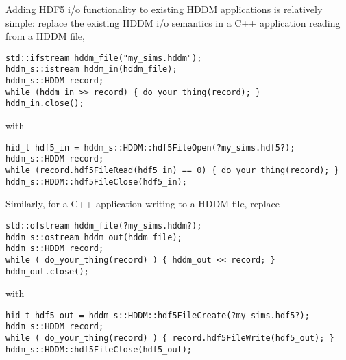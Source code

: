 \documentclass{revtex4}
\begin{document}
Adding HDF5 i/o functionality to existing HDDM applications is relatively 
simple: replace the existing HDDM i/o semantics in a C++ application reading
from a HDDM file,

\vspace{0.5cm}
\begin{minipage}{12cm}
\begin{verbatim}
std::ifstream hddm_file("my_sims.hddm");
hddm_s::istream hddm_in(hddm_file);
hddm_s::HDDM record;
while (hddm_in >> record) { do_your_thing(record); }
hddm_in.close();
\end{verbatim}
\end{minipage}
\vspace{0.5cm}

with

\vspace{0.5cm}
\begin{minipage}{12cm}
\begin{verbatim}
hid_t hdf5_in = hddm_s::HDDM::hdf5FileOpen(?my_sims.hdf5?);
hddm_s::HDDM record;
while (record.hdf5FileRead(hdf5_in) == 0) { do_your_thing(record); }
hddm_s::HDDM::hdf5FileClose(hdf5_in);
\end{verbatim}
\end{minipage}
\vspace{0.5cm}

Similarly, for a C++ application writing to a HDDM file, replace

\vspace{0.5cm}
\begin{minipage}{12cm}
\begin{verbatim}
std::ofstream hddm_file(?my_sims.hddm?);
hddm_s::ostream hddm_out(hddm_file);
hddm_s::HDDM record;
while ( do_your_thing(record) ) { hddm_out << record; }
hddm_out.close();
\end{verbatim}
\end{minipage}
\vspace{0.5cm}

with

\vspace{0.5cm}
\begin{minipage}{12cm}
\begin{verbatim}
hid_t hdf5_out = hddm_s::HDDM::hdf5FileCreate(?my_sims.hdf5?);
hddm_s::HDDM record;
while ( do_your_thing(record) ) { record.hdf5FileWrite(hdf5_out); }
hddm_s::HDDM::hdf5FileClose(hdf5_out);
\end{verbatim}
\end{minipage}
\vspace{0.5cm}
\end{document}
